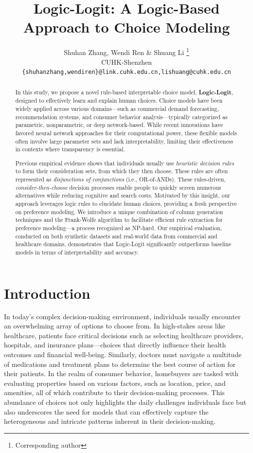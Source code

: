 \documentclass{article} %
\title{Logic-Logit: A Logic-Based Approach to Choice Modeling}
\author{Shuhan Zhang, Wendi Ren \& Shuang Li \thanks{Corresponding author} \\
CUHK-Shenzhen\\
\texttt{\{shuhanzhang,wendiren\}@link.cuhk.edu.cn,lishuang@cuhk.edu.cn} \\
}
\begin{document}
%
%
\setlength{\floatsep}{1.5ex}
\setlength{\textfloatsep}{1.5ex}
%
%
%
\setlength{\parskip}{0.5ex}
\maketitle

\begin{abstract}
In this study, we propose a novel rule-based interpretable choice model, {\bf Logic-Logit}, designed to effectively learn and explain human choices. Choice models have been widely applied across various domains—such as commercial demand forecasting, recommendation systems, and consumer behavior analysis—typically categorized as parametric, nonparametric, or deep network-based. While recent innovations have favored neural network approaches for their computational power, these flexible models often involve large parameter sets and lack interpretability, limiting their effectiveness in contexts where transparency is essential. 

Previous empirical evidence shows that individuals usually use {\it heuristic decision rules} to form their consideration sets, from which they then choose. These rules are often represented as {\it disjunctions of conjunctions} (i.e., OR-of-ANDs). These rules-driven, {\it consider-then-choose} decision processes enable people to quickly screen numerous alternatives while reducing cognitive and search costs. Motivated by this insight, our approach leverages logic rules to elucidate human choices, providing a fresh perspective on preference modeling. We introduce a unique combination of column generation techniques and the Frank-Wolfe algorithm to facilitate efficient rule extraction for preference modeling—a process recognized as NP-hard. Our empirical evaluation, conducted on both synthetic datasets and real-world data from commercial and healthcare domains, demonstrates that Logic-Logit significantly outperforms baseline models in terms of interpretability and accuracy.

%
\end{abstract}

\section{Introduction}
In today's complex decision-making environment, individuals usually encounter an overwhelming array of options to choose from. In high-stakes areas like healthcare, patients face critical decisions such as selecting healthcare providers, hospitals, and insurance plans—choices that directly influence their health outcomes and financial well-being. Similarly, doctors must navigate a multitude of medications and treatment plans to determine the best course of action for their patients. In the realm of consumer behavior, homebuyers are tasked with evaluating properties based on various factors, such as location, price, and amenities, all of which contribute to their decision-making processes. 
This abundance of choices not only highlights the daily challenges individuals face but also underscores the need for models that can effectively capture the heterogeneous and intricate patterns inherent in their decision-making.
\end{document}
